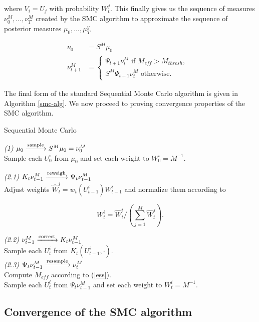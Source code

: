 where $V_i = U_j$ with probability $W^j_t$. This finally gives us the sequence of measures $\nu^M_0, \ldots, \nu^M_T$ created by the SMC algorithm to approximate the sequence of posterior measures $\mu_0, \ldots, \mu^y_T$

\begin{align*}
  \nu_0 &= S^M\mu_0\\
  \nu_{t+1}^M &= \begin{cases}
    \Psi_{t+1}\nu^M_t\text{\ \ \ \ \ \ \ \ if $M_{eff} > M_{thresh},$ }\\
    S^M\Psi_{t+1}\nu^M_t\text{\ \ \ \ otherwise. }
  \end{cases}
\end{align*}

The final form of the standard Sequential Monte Carlo algorithm is given in Algorithm \ref{smc-alg}. We now proceed to proving convergence properties of the SMC algorithm.

\begin{algorithm}[h]
  \label{smc-alg}
  \caption{Sequential Monte Carlo}
  \textit{(1) $\mu_0 \xrightarrow{\text{sample}} S^M\mu_0 = \nu^M_0$}\\
  Sample each $U^i_0$ from $\mu_0$ and
  set each weight to $W^i_0 = M^{-1}$. \\
  \;
   {
    \textit{(2.1) $K_t\nu^M_{t-1}\xrightarrow{\text{reweigh}} \Psi_t\nu^M_{t-1}$}\\
    Adjust weights $\hat W^i_t = w_t(U^i_{t-1})W^i_{t-1}$ and normalize them according to

    \begin{equation*}
      W^i_t = \hat W^i_t \Big/ \left(\sum_{j=1}^M\hat W_t^j\right).
    \end{equation*}
    
    \textit{(2.2) $\nu^M_{t-1} \xrightarrow{\text{correct}} K_t\nu^M_{t-1}$ }\\
    Sample each $U^i_t$ from $K_t(U^i_{t-1}, \cdot)$.\\
    \;
    \textit{(2.3) $\Psi_t\nu^M_{t-1} \xrightarrow{\text{resample}} \nu^M_t$}\\
    Compute $M_{eff}$ according to (\ref{ess}).\\
     {
      Sample each $U^i_t$ from $\Psi_t\nu^M_{t-1}$ and set each weight to $W^i_t = M^{-1}$.
    }
  }
\end{algorithm}

\subsection{Convergence of the SMC algorithm}

